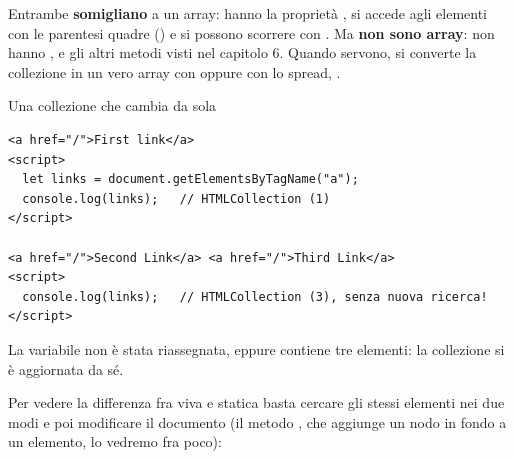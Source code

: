 Entrambe \textbf{somigliano} a un array: hanno la proprietà , si
accede agli elementi con le parentesi quadre () e si possono
scorrere con . Ma \textbf{non sono array}: non hanno ,
 e gli altri metodi visti nel capitolo 6. Quando servono, si
converte la collezione in un vero array con  oppure con
lo spread, \code{[...lista]}.

\begin{esempio}{Una collezione che cambia da sola}
\begin{affianco}[0.6][c]
\begin{lstlisting}[style=html, name=live.html]
<a href="/">First link</a>
<script>
  let links = document.getElementsByTagName("a");
  console.log(links);   // HTMLCollection (1)
</script>

<a href="/">Second Link</a> <a href="/">Third Link</a>
<script>
  console.log(links);   // HTMLCollection (3), senza nuova ricerca!
</script>
\end{lstlisting}
\risultato
\begin{immagine}
\end{immagine}
\end{affianco}

La variabile  non è stata riassegnata, eppure contiene tre elementi:
la collezione si è aggiornata da sé.
\end{esempio}

Per vedere la differenza fra viva e statica basta cercare gli stessi elementi
nei due modi e poi modificare il documento (il metodo , che
aggiunge un nodo in fondo a un elemento, lo vedremo fra poco):

